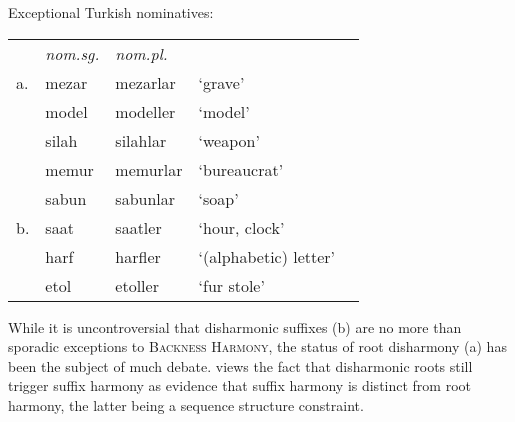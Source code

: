\begin{example}
Exceptional Turkish nominatives: 

\vspace{0.5\baselineskip}
\begin{tabular}{l l l l l}
   & \emph{nom.sg.} & \emph{nom.pl.} \\
a. & mezar          & mezarlar       & `grave' & \citep{TELL} \\
   & model          & modeller       & `model' \\
   & silah          & silahlar       & `weapon'     \\
   & memur          & memurlar       & `bureaucrat' \\
   & sabun          & sabunlar       & `soap'       \\
b. & saat           & saatler        & `hour, clock' \\
   & harf           & harfler        & `(alphabetic) letter' \\ %
   & etol           & etoller        & `fur stole' \\
\end{tabular}
\end{example}

While it is uncontroversial that disharmonic suffixes (\lastx b) are no more than sporadic exceptions to \textsc{Backness Harmony}, the status of root disharmony (\lastx a) has been the subject of much debate. \citet[][212, 289]{Anderson1974} views the fact that disharmonic roots still trigger suffix harmony as evidence that suffix harmony is distinct from root harmony, the latter being a sequence structure constraint. 


%


